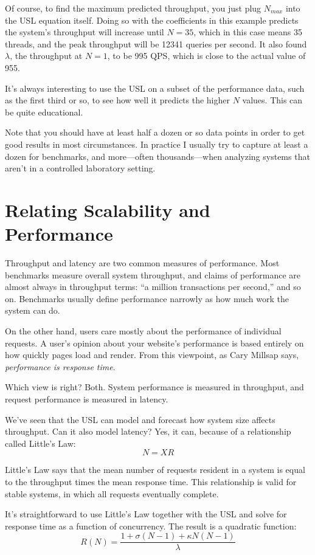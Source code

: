 \documentclass{vivid_layout}
\begin{document}
Of course, to find the maximum predicted throughput, you just plug $N_{max}$
into the USL equation itself. Doing so with the coefficients in this example
predicts the system's throughput will increase until $N=35$, which in this case
means 35 threads, and the peak throughput will be 12341 queries per second. It
also found $\lambda$, the throughput at $N=1$, to be 995 QPS, which is close to
the actual value of 955.

It's always interesting to use the USL on a subset of the performance data, such
as the first third or so, to see how well it predicts the higher $N$ values.
This can be quite educational.

Note that you should have at least half a dozen or so data points in order to
get good results in most circumstances. In practice I usually try to capture at
least a dozen for benchmarks, and more---often thousands---when analyzing
systems that aren't in a controlled laboratory setting.

\section{Relating Scalability and Performance}

Throughput and latency are two common measures of performance. Most benchmarks
measure overall system throughput, and claims of performance are almost always
in throughput terms: ``a million transactions per second,'' and so on.
Benchmarks usually define performance narrowly as how much work the system can
do.

On the other hand, users care mostly about the performance of individual
requests. A user's opinion about your website's performance is based entirely on
how quickly pages load and render.  From this viewpoint, as Cary Millsap says,
{\itshape performance is response time}.

Which view is right? Both. System performance is measured in throughput, and
request performance is measured in latency.

We've seen that the USL can model and forecast how system size affects
throughput. Can it also model latency? Yes, it can, because of a
relationship called Little's Law:
\[
N = X R
\]

Little's Law says that the mean number of requests resident in a system is
equal to the throughput times the mean response time. This relationship is
valid for stable systems, in which all requests eventually complete.

It's straightforward to use Little's Law together with the USL and solve for
response time as a function of concurrency.  The result is a quadratic function:
\[
R(N)=\frac{1+\sigma(N-1)+\kappa N(N-1)}{\lambda}
\]
\end{document}

